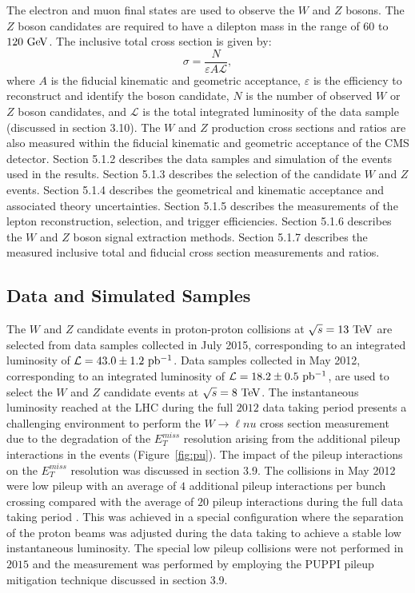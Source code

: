 The electron and muon final states are used to observe the $W$ and $Z$ bosons. The $Z$ boson candidates are required to have a dilepton mass in the range of $60$ to $120~\mathrm{Ge\kern -0.1em V}$. The inclusive total cross section is given by:  
\begin{equation} \label{eq:xsec2}
\sigma = \frac{N}{\varepsilon A \mathcal{L}},
\end{equation}
where $A$ is the fiducial kinematic and geometric acceptance, $\varepsilon$ is the efficiency to reconstruct and identify the boson candidate, $N$ is the number of observed $W$ or $Z$ boson candidates, and $\mathcal{L}$ is the total integrated luminosity of the data sample (discussed in section 3.10).  The $W$ and $Z$ production cross sections and ratios are also measured within the fiducial kinematic and geometric acceptance of the CMS detector.  Section 5.1.2 describes the data samples and simulation of the events used in the results. Section 5.1.3 describes the selection of the candidate $W$ and $Z$ events. Section 5.1.4 describes the geometrical and kinematic acceptance and associated theory uncertainties. Section 5.1.5 describes the measurements of the lepton reconstruction, selection, and trigger efficiencies. Section 5.1.6 describes the $W$ and $Z$ boson signal extraction methods. Section 5.1.7 describes the measured inclusive total and fiducial cross section measurements and ratios.  

\subsection{Data and Simulated Samples}

The $W$ and $Z$ candidate events in proton-proton collisions at $\sqrt{s}=13~\mathrm{Te\kern -0.1em V}$ are selected from data samples collected in July 2015, corresponding to an integrated luminosity of $\mathcal{L}=43.0\pm1.2~\mathrm{pb^{-1}}$. Data samples collected in May 2012, corresponding to an integrated luminosity of $\mathcal{L}=18.2\pm0.5~\mathrm{pb^{-1}}$, are used to select the $W$ and $Z$ candidate events at $\sqrt{s}=8~\mathrm{Te\kern -0.1em V}$. The instantaneous luminosity reached at the LHC during the full $2012$ data taking period presents a challenging environment to perform the $W \rightarrow \ell nu$ cross section measurement due to the degradation of the $E_{T}^{miss}$ resolution arising from the additional pileup interactions in the events (Figure~\ref{fig:pu}). The impact of the pileup interactions on the $E_{T}^{miss}$ resolution was discussed in section 3.9. The collisions in May 2012 were low pileup with an average of $4$ additional pileup interactions per bunch crossing compared with the average of $20$ pileup interactions during the full data taking period . This was achieved in a special configuration where the separation of the proton beams was adjusted during the data taking to achieve a stable low instantaneous luminosity. The special low pileup collisions were not performed in $2015$ and the measurement was performed by employing the PUPPI pileup mitigation technique discussed in section 3.9.


